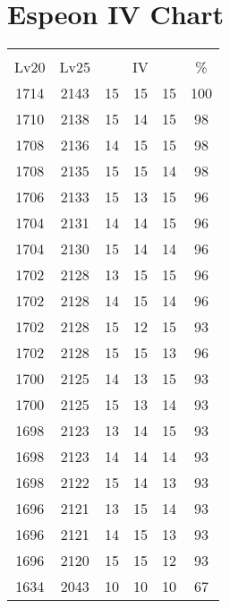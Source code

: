 \documentclass{article}%
\begin{document}
%
\normalsize%
\section{Espeon IV Chart}%
\label{sec:Espeon IV Chart}%
\renewcommand{\arraystretch}{1.5}%
\begin{tabular}{|c|c|c|c|c|c|}%
\hline%
\multicolumn{6}{|c|}{\textcolor{white}{ 
\linebreak{Espeon}
}%
\cellcolor{black}}\\%
\multicolumn{1}{|c}{Lv20}&\multicolumn{1}{c|}{Lv25}&\multicolumn{3}{c|}{IV}&\multicolumn{1}{|c|}{\%}\\%
\hline%
\rowcolor{color100}%
1714&2143&15&15&15&100\\%
\hline%
\rowcolor{color98}%
1710&2138&15&14&15&98\\%
\hline%
\rowcolor{color98}%
1708&2136&14&15&15&98\\%
\hline%
\rowcolor{color98}%
1708&2135&15&15&14&98\\%
\hline%
\rowcolor{color96}%
1706&2133&15&13&15&96\\%
\hline%
\rowcolor{color96}%
1704&2131&14&14&15&96\\%
\hline%
\rowcolor{color96}%
1704&2130&15&14&14&96\\%
\hline%
\rowcolor{color96}%
1702&2128&13&15&15&96\\%
\hline%
\rowcolor{color96}%
1702&2128&14&15&14&96\\%
\hline%
\rowcolor{color93}%
1702&2128&15&12&15&93\\%
\hline%
\rowcolor{color96}%
1702&2128&15&15&13&96\\%
\hline%
\rowcolor{color93}%
1700&2125&14&13&15&93\\%
\hline%
\rowcolor{color93}%
1700&2125&15&13&14&93\\%
\hline%
\rowcolor{color93}%
1698&2123&13&14&15&93\\%
\hline%
\rowcolor{color93}%
1698&2123&14&14&14&93\\%
\hline%
\rowcolor{color93}%
1698&2122&15&14&13&93\\%
\hline%
\rowcolor{color93}%
1696&2121&13&15&14&93\\%
\hline%
\rowcolor{color93}%
1696&2121&14&15&13&93\\%
\hline%
\rowcolor{color93}%
1696&2120&15&15&12&93\\%
\hline%
\rowcolor{color91}%
1634&2043&10&10&10&67\\%
\end{tabular}

%
\end{document}
